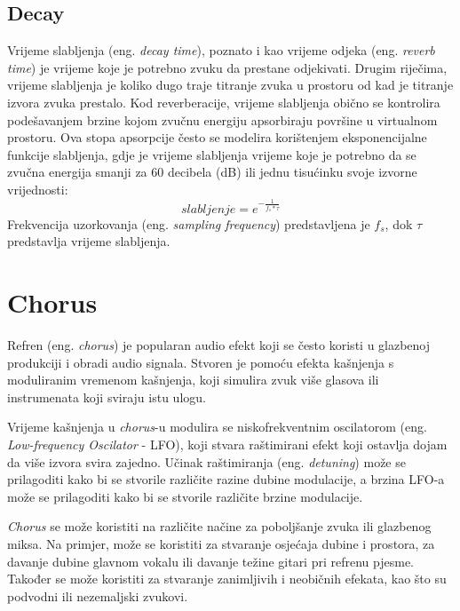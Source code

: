 \documentclass[times, utf8, seminar, numeric]{fer}
\begin{document}
\subsection{Decay}
Vrijeme slabljenja (eng. \textit{decay time}), poznato i kao vrijeme odjeka (eng. \textit{reverb time}) je vrijeme koje je potrebno zvuku da prestane odjekivati. Drugim riječima, vrijeme slabljenja je koliko dugo traje titranje zvuka u prostoru od kad je titranje izvora zvuka prestalo.\cite{nativeinstrumentsReverbEssential}
Kod reverberacije, vrijeme slabljenja obično se kontrolira podešavanjem brzine kojom zvučnu energiju apsorbiraju površine u virtualnom prostoru. Ova stopa apsorpcije često se modelira korištenjem eksponencijalne funkcije slabljenja, gdje je vrijeme slabljenja vrijeme koje je potrebno da se zvučna energija smanji za 60 decibela (dB) ili jednu tisućinku svoje izvorne vrijednosti:
\begin{equation*}
	slabljenje = e^{-\frac{1}{f_s * \tau}}
\end{equation*}
Frekvencija uzorkovanja (eng. \textit{sampling frequency}) predstavljena je $f_s$, dok $\tau$ predstavlja vrijeme slabljenja.

\section{Chorus}

Refren (eng. \textit{chorus}) je popularan audio efekt koji se često koristi u glazbenoj produkciji i obradi audio signala. Stvoren je pomoću efekta kašnjenja s moduliranim vremenom kašnjenja, koji simulira zvuk više glasova ili instrumenata koji sviraju istu ulogu.\cite{dattorro1997effect}

Vrijeme kašnjenja u \textit{chorus}-u modulira se niskofrekventnim oscilatorom (eng. \textit{Low-frequency Oscilator} - LFO), koji stvara raštimirani efekt koji ostavlja dojam da više izvora svira zajedno. Učinak raštimiranja (eng. \textit{detuning}) može se prilagoditi kako bi se stvorile različite razine dubine modulacije, a brzina LFO-a može se prilagoditi kako bi se stvorile različite brzine modulacije.

\textit{Chorus} se može koristiti na različite načine za poboljšanje zvuka ili glazbenog miksa. Na primjer, može se koristiti za stvaranje osjećaja dubine i prostora, za davanje dubine glavnom vokalu ili davanje težine gitari pri refrenu pjesme. Također se može koristiti za stvaranje zanimljivih i neobičnih efekata, kao što su podvodni ili nezemaljski zvukovi.
\end{document}
